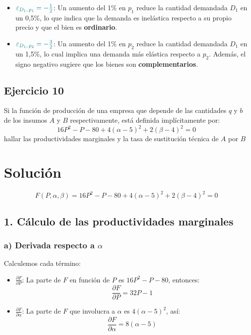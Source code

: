 \documentclass{article}
\begin{document}
\begin{itemize}
    \item \(\color{teal}\varepsilon_{D_1,\,p_1} = -\frac{1}{2}\): Un aumento del 1\% en \(p_1\) reduce la cantidad demandada \(D_1\) en un 0{,}5\%, lo que indica que la demanda es inelástica respecto a su propio precio y que el bien es \textbf{\color{teal}ordinario}.
    \item \(\color{teal}\varepsilon_{D_1,\,p_2} = -\frac{3}{2}\): Un aumento del 1\% en \(p_2\) reduce la cantidad demandada \(D_1\) en un 1{,}5\%, lo cual implica una demanda más elástica respecto a \(p_2\). Además, el signo negativo sugiere que los bienes son \textbf{\color{teal}complementarios}.
\end{itemize}

\newpage
\subsection{Ejercicio 10}
Si la función de producción de una empresa que depende de las cantidades \(q\) y \(b\) de los insumos \(A\) y \(B\) respectivamente, está definida implícitamente por:
\[
16P^2 - P - 80 + 4(\alpha-5)^2 + 2(\beta-4)^2 = 0
\]
hallar las productividades marginales y la tasa de sustitución técnica de \(A\) por \(B\)

\newpage
\section*{Solución}

\[
F(P,\alpha,\beta) = 16P^2 - P - 80 + 4(\alpha-5)^2 + 2(\beta-4)^2 = 0
\]

\subsection*{1. Cálculo de las productividades marginales}

\subsubsection*{a) Derivada respecto a \(\alpha\)}

Calculemos cada término:

\begin{itemize}
    \item \(\displaystyle \frac{\partial F}{\partial P}\):  
    La parte de \(F\) en función de \(P\) es \(16P^2 - P - 80\), entonces:
    \[
    \frac{\partial F}{\partial P} = 32P - 1
    \]
    
    \item \(\displaystyle \frac{\partial F}{\partial \alpha}\):  
    La parte de \(F\) que involucra a \(\alpha\) es \(4(\alpha-5)^2\), así:
    \[
    \frac{\partial F}{\partial \alpha} = 8(\alpha-5)
    \]
\end{itemize}
\end{document}
